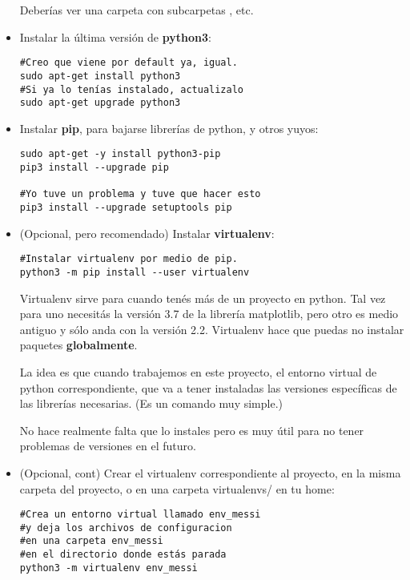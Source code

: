 \documentclass[10pt,a4paper]{report}
\begin{document}
\begin{itemize}
Deberías ver una carpeta  con subcarpetas , etc.

\item Instalar la última versión de \textbf{python3}:

\begin{lstlisting}
#Creo que viene por default ya, igual.
sudo apt-get install python3
#Si ya lo tenías instalado, actualizalo
sudo apt-get upgrade python3
\end{lstlisting}

\item Instalar \textbf{pip}, para bajarse librerías de python, y otros yuyos:

\begin{lstlisting}
sudo apt-get -y install python3-pip
pip3 install --upgrade pip

#Yo tuve un problema y tuve que hacer esto
pip3 install --upgrade setuptools pip
\end{lstlisting}

\item (Opcional, pero recomendado) Instalar \textbf{virtualenv}:

\begin{lstlisting}
#Instalar virtualenv por medio de pip.
python3 -m pip install --user virtualenv
\end{lstlisting}

Virtualenv sirve para cuando tenés más de un proyecto en python. Tal vez para uno necesitás la versión 3.7 de la librería matplotlib, pero otro es medio antiguo y sólo anda con la versión 2.2. Virtualenv hace que puedas no instalar paquetes \textbf{globalmente}.

La idea es que cuando trabajemos en este proyecto,  el entorno virtual de python correspondiente, que va a tener instaladas las versiones específicas de las librerías necesarias. (Es un comando muy simple.)

No hace realmente falta que lo instales pero es muy útil para no tener problemas de versiones en el futuro.

\item (Opcional, cont) Crear el virtualenv correspondiente al proyecto, en la misma carpeta del proyecto, o en una carpeta virtualenvs/ en tu home:

\begin{lstlisting}
#Crea un entorno virtual llamado env_messi
#y deja los archivos de configuracion
#en una carpeta env_messi
#en el directorio donde estás parada
python3 -m virtualenv env_messi
\end{lstlisting}


\end{itemize}
\end{document}
